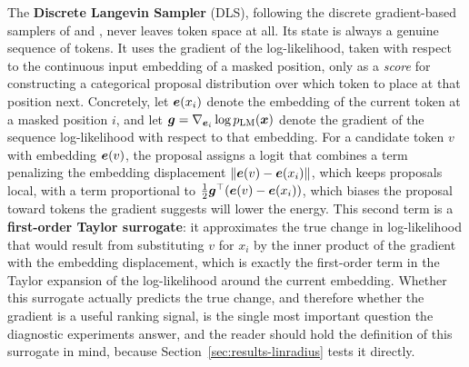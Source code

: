 The \textbf{Discrete Langevin Sampler} (DLS), following the discrete gradient-based samplers of \citet{grathwohl2021oops} and \citet{zhang2022langevin}, never leaves token space at all. Its state is always a genuine sequence of tokens. It uses the gradient of the log-likelihood, taken with respect to the continuous input embedding of a masked position, only as a \emph{score} for constructing a categorical proposal distribution over which token to place at that position next. Concretely, let $\bm{e}(x_i)$ denote the embedding of the current token at a masked position $i$, and let $\bm{g} = \nabla_{\bm{e}_i}\log p_{\text{LM}}(\bm{x})$ denote the gradient of the sequence log-likelihood with respect to that embedding. For a candidate token $v$ with embedding $\bm{e}(v)$, the proposal assigns a logit that combines a term penalizing the embedding displacement $\left\lVert\bm{e}(v) - \bm{e}(x_i)\right\rVert$, which keeps proposals local, with a term proportional to $\tfrac{1}{2}\bm{g}^\top(\bm{e}(v) - \bm{e}(x_i))$, which biases the proposal toward tokens the gradient suggests will lower the energy. This second term is a \textbf{first-order Taylor surrogate}: it approximates the true change in log-likelihood that would result from substituting $v$ for $x_i$ by the inner product of the gradient with the embedding displacement, which is exactly the first-order term in the Taylor expansion of the log-likelihood around the current embedding. Whether this surrogate actually predicts the true change, and therefore whether the gradient is a useful ranking signal, is the single most important question the diagnostic experiments answer, and the reader should hold the definition of this surrogate in mind, because Section~\ref{sec:results-linradius} tests it directly.


